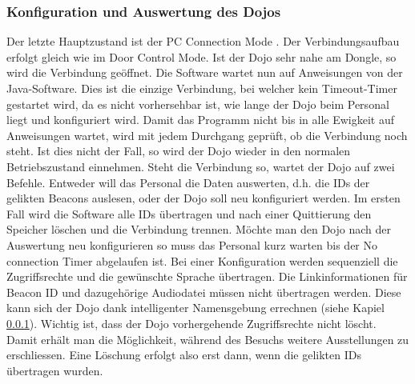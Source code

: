 \subsubsection{Konfiguration und Auswertung des Dojos}
Der letzte Hauptzustand ist der PC Connection Mode . Der Verbindungsaufbau erfolgt gleich wie im Door Control Mode. Ist der Dojo sehr nahe am Dongle, so wird die Verbindung geöffnet. Die Software wartet nun auf Anweisungen von der Java-Software. Dies ist die einzige Verbindung, bei welcher kein Timeout-Timer gestartet wird, da es nicht vorhersehbar ist, wie lange der Dojo beim Personal liegt und konfiguriert wird. Damit das Programm nicht bis in alle Ewigkeit auf Anweisungen wartet, wird mit jedem Durchgang geprüft, ob die Verbindung noch steht. Ist dies nicht der Fall, so wird der Dojo wieder in den normalen Betriebszustand einnehmen. 
Steht die Verbindung so, wartet der Dojo auf zwei Befehle. Entweder will das Personal die Daten auswerten, d.h. die IDs der gelikten Beacons auslesen, oder der Dojo soll neu konfiguriert werden. Im ersten Fall wird die Software alle IDs übertragen und nach einer Quittierung den Speicher löschen und die Verbindung trennen. Möchte man den Dojo nach der Auswertung neu konfigurieren so muss das Personal kurz warten bis der No connection Timer abgelaufen ist. Bei einer Konfiguration werden sequenziell die Zugriffsrechte und die gewünschte Sprache übertragen. Die Linkinformationen für Beacon ID und dazugehörige Audiodatei müssen nicht übertragen werden. Diese kann sich der Dojo dank intelligenter Namensgebung errechnen (siehe Kapiel \ref{}). Wichtig ist, dass der Dojo vorhergehende Zugriffsrechte nicht löscht. Damit erhält man die Möglichkeit, während des Besuchs weitere Ausstellungen zu erschliessen. Eine Löschung erfolgt also erst dann, wenn die gelikten IDs übertragen wurden.
